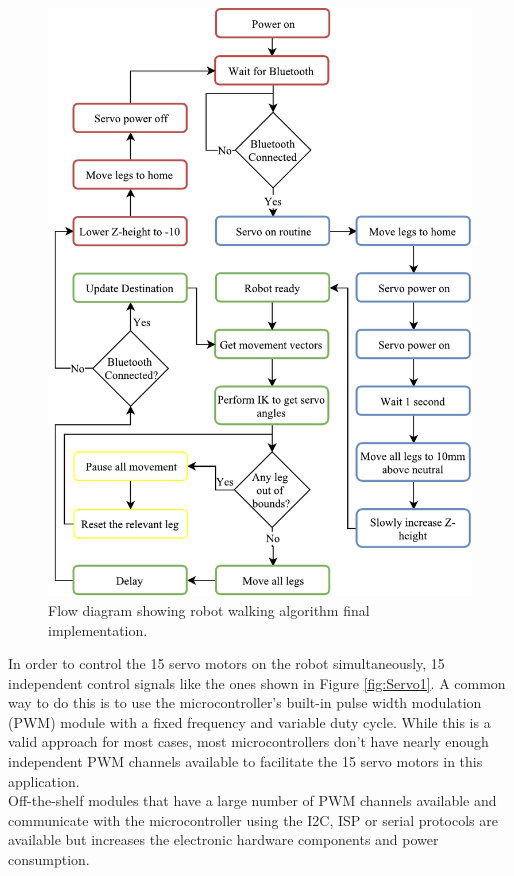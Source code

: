 \begin{figure}[H]
\centering
\includegraphics[scale = 1]{pics/Soft2.pdf}
\caption{Flow diagram showing robot walking algorithm final implementation.}
\label{fig:Soft2}
\end{figure}

In order to control the 15 servo motors on the robot simultaneously, 15 independent control signals like the ones shown in Figure \ref{fig:Servo1}. A common way to do this is to use the microcontroller's built-in pulse width modulation (PWM) module with a fixed frequency and variable duty cycle. While this is a valid approach for most cases, most microcontrollers don't have nearly enough independent PWM channels available to facilitate the 15 servo motors in this application.\\

Off-the-shelf modules that have a large number of PWM channels available and communicate with the microcontroller using the I2C, ISP or serial protocols are available but increases the electronic hardware components and power consumption.\\

